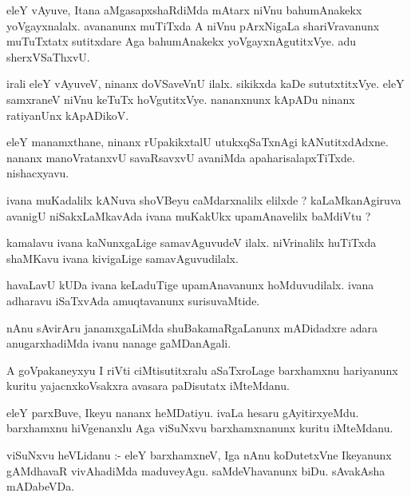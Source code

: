 \documentclass{article}
\begin{document}
\begin{mn}
eleY vAyuve, Itana aMgasapxshaRdiMda mAtarx niVnu bahumAnakekx yoVgayxnalalx.  avananunx  muTiTxda A niVnu 
pArxNigaLa  shariVravanunx  muTuTxtatx sutitxdare Aga bahumAnakekx yoVgayxnAgutitxVye.  adu sherxVSaThxvU. 
\end{mn}

\begin{mn}
irali eleY vAyuveV, ninanx doVSaveVnU ilalx. sikikxda kaDe sututxtitxVye.  eleY 
samxraneV niVnu keTuTx hoVgutitxVye.  nananxnunx kApADu ninanx ratiyanUnx kApADikoV. 
\end{mn}

\begin{mn}
eleY manamxthane,  ninanx rUpakikxtalU  utukxqSaTxnAgi kANutitxdAdxne.  nananx 
manoVratanxvU  savaRsavxvU  avaniMda apaharisalapxTiTxde.  nishacxyavu.
\end{mn}

\begin{mn}
ivana muKadalilx kANuva shoVBeyu caMdarxnalilx elilxde ?  kaLaMkanAgiruva  
avanigU  niSakxLaMkavAda  ivana muKakUkx  upamAnavelilx baMdiVtu ?
\end{mn}

\begin{mn}
kamalavu ivana kaNunxgaLige  samavAguvudeV ilalx.  niVrinalilx huTiTxda  
shaMKavu ivana kivigaLige samavAguvudilalx.
\end{mn}

\begin{mn}
havaLavU kUDa ivana keLaduTige upamAnavanunx  hoMduvudilalx.  ivana adharavu 
iSaTxvAda amuqtavanunx surisuvaMtide.
\end{mn}

\begin{mn}
nAnu sAvirAru janamxgaLiMda  shuBakamaRgaLanunx  mADidadxre  adara anugarxhadiMda  
ivanu nanage gaMDanAgali.
\end{mn}

\begin{mn}
A goVpakaneyxyu I riVti ciMtisutitxralu aSaTxroLage barxhamxnu hariyanunx  
kuritu yajacnxkoVsakxra avasara paDisutatx  iMteMdanu.
\end{mn}  

\begin{mn}
eleY parxBuve, Ikeyu nananx heMDatiyu.  ivaLa hesaru gAyitirxyeMdu.  barxhamxnu  
hiVgenanxlu Aga viSuNxvu barxhamxnanunx kuritu iMteMdanu. 
\end{mn}

\begin{mn}
viSuNxvu heVLidanu :- eleY barxhamxneV, Iga nAnu koDutetxVne Ikeyanunx gAMdhavaR 
vivAhadiMda maduveyAgu.  saMdeVhavanunx biDu. sAvakAsha mADabeVDa.
\end{mn}
\end{document}
